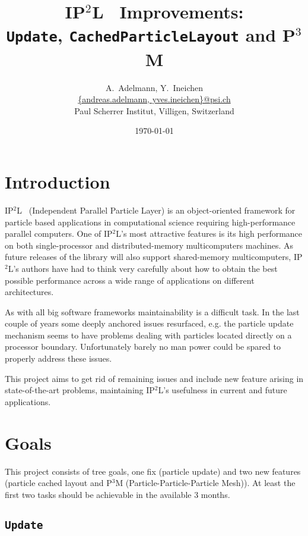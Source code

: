 \documentclass[10pt,a4paper]{scrartcl}
\newcommand{\ippl}{\textsc{IP$^2$L}}
\begin{document}
\title{\ippl~ Improvements: \\ \texttt{Update}, \texttt{CachedParticleLayout}
and P$^3$M}
\author{A.~Adelmann, Y.~Ineichen\\ 
        \url{{andreas.adelmann, yves.ineichen}@psi.ch} \\
        \small{Paul Scherrer Institut, Villigen, Switzerland}
}
\date{\today}
\maketitle


\section{Introduction}

\ippl~ (Independent Parallel Particle Layer) is an object-oriented framework for
particle based applications in computational science requiring high-performance
parallel computers. One of \ippl's most attractive features is its high
performance on both single-processor and distributed-memory multicomputers
machines. As future releases of the library will also support shared-memory
multicomputers, \ippl's authors have had to think very carefully about how to
obtain the best possible performance across a wide range of applications on
different architectures.

As with all big software frameworks maintainability is a difficult task. In the
last couple of years some deeply anchored issues resurfaced, e.g. the particle
update mechanism seems to have problems dealing with particles located directly
on a processor boundary. Unfortunately barely no man power could be spared to
properly address these issues.

This project aims to get rid of remaining issues and include new feature arising
in state-of-the-art problems, maintaining \ippl's usefulness in current and future
applications.

\section{Goals}

This project consists of tree goals, one fix (particle update) and two new
features (particle cached layout and P$^3$M (Particle-Particle-Particle Mesh)).
At least the first two tasks should be achievable in the available 3 months.

\subsection{\texttt{Update}}
\end{document}
